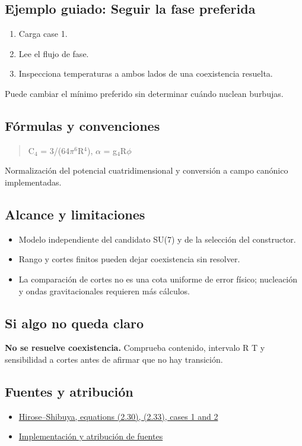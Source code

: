 \documentclass[11pt,a4paper]{article}
\begin{document}
\subsection*{Ejemplo guiado: Seguir la fase preferida}
\begin{enumerate}
\item Carga case 1.
\item Lee el flujo de fase.
\item Inspecciona temperaturas a ambos lados de una coexistencia resuelta.
\end{enumerate}
Puede cambiar el mínimo preferido sin determinar cuándo nuclean burbujas.
\subsection*{Fórmulas y convenciones}
\begin{quote}C\ensuremath{{}_{4}} = 3/(64\ensuremath{\pi}\ensuremath{{}^{6}}R\ensuremath{{}^{4}}),  \ensuremath{\alpha} = g\ensuremath{{}_{4}}R\ensuremath{\phi}\end{quote}
Normalización del potencial cuatridimensional y conversión a campo canónico implementadas.

\subsection*{Alcance y limitaciones}
\begin{itemize}
\item Modelo independiente del candidato SU(7) y de la selección del constructor.
\item Rango y cortes finitos pueden dejar coexistencia sin resolver.
\item La comparación de cortes no es una cota uniforme de error físico; nucleación y ondas gravitacionales requieren más cálculos.
\end{itemize}
\subsection*{Si algo no queda claro}
\textbf{No se resuelve coexistencia.} Comprueba contenido, intervalo R T y sensibilidad a cortes antes de afirmar que no hay transición.

\subsection*{Fuentes y atribución}
\begin{itemize}
\item \href{https://arxiv.org/abs/2303.14192}{Hirose--Shibuya, equations (2.30), (2.33), cases 1 and 2}
\item \href{https://github.com/karlesmarin/ghu-lab/blob/main/src/modules/thermal_ghu.mjs}{Implementación y atribución de fuentes}
\end{itemize}
\end{document}
